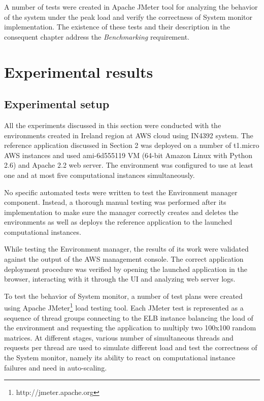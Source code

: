 \documentclass[conference]{IEEEtran}
\begin{document}
A number of tests were created in Apache JMeter tool for analyzing the behavior of the system under the peak load and verify the correctness of System monitor implementation. The existence of these tests and their description in the consequent chapter address the \emph{Benchmarking} requirement.

\section{Experimental results}

\subsection{Experimental setup}

All the experiments discussed in this section were conducted with the environments created in Ireland region at AWS cloud using IN4392 system. The reference application discussed in Section 2 was deployed on a number of t1.micro AWS instances and used ami-6d555119 VM (64-bit Amazon Linux with Python 2.6) and Apache 2.2 web server. The environment was configured to use at least one and at most five computational instances simultaneously.

No specific automated tests were written to test the Environment manager component. Instead, a thorough manual testing was performed after its implementation to make sure the manager correctly creates and deletes the environments as well as deploys the reference application to the launched computational instances.

While testing the Environment manager, the results of its work were validated against the output of the AWS management console. The correct application deployment procedure was verified by opening the launched application in the browser, interacting with it through the UI and analyzing web server logs. 

To test the behavior of System monitor, a number of test plans were created using Apache JMeter\footnote{http://jmeter.apache.org} load testing tool. Each JMeter test is represented as a sequence of thread groups connecting to the ELB instance balancing the load of the environment and requesting the application to multiply two 100x100 random matrices. At different stages, various number of simultaneous threads and requests per thread are used to simulate different load and test the correctness of the System monitor, namely its ability to react on computational instance failures and need in auto-scaling.
\end{document}
